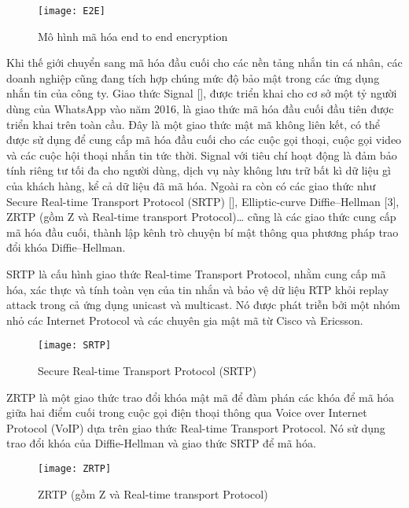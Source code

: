 \documentclass[../main-report.tex]{subfiles}
\begin{document}
\begin{figure}[ht!]
\begin{center}
\label{fig:E2E}
\texttt{[image: E2E]}
\caption{Mô hình mã hóa end to end encryption}
\end{center}
\end{figure}

Khi thế giới chuyển sang mã hóa đầu cuối cho các nền tảng nhắn tin cá nhân, các doanh nghiệp cũng đang tích hợp chúng mức độ bảo mật trong các ứng dụng nhắn tin của công ty. Giao thức Signal [\cite{1}], được triển khai cho cơ sở một tỷ người dùng của WhatsApp vào năm 2016, là giao thức mã hóa đầu cuối đầu tiên được triển khai trên toàn cầu. Đây là một giao thức mật mã không liên kết, có thể được sử dụng để cung cấp mã hóa đầu cuối cho các cuộc gọi thoại, cuộc gọi video và các cuộc hội thoại nhắn tin tức thời. Signal với tiêu chí hoạt động là đảm bảo tính riêng tư tối đa cho người dùng, dịch vụ này không lưu trữ bất kì dữ liệu gì của khách hàng, kể cả dữ liệu đã mã hóa. Ngoài ra còn có các giao thức như Secure Real-time Transport Protocol (SRTP) [\cite{2}], Elliptic-curve Diffie–Hellman [3], ZRTP (gồm Z và Real-time transport Protocol)… cũng là các giao thức cung cấp mã hóa đầu cuối, thành lập kênh trò chuyện bí mật thông qua phương pháp trao đổi khóa Diffie–Hellman.

SRTP là cấu hình giao thức Real-time Transport Protocol, nhằm cung cấp mã hóa, xác thực và tính toàn vẹn của tin nhắn và bảo vệ dữ liệu RTP khỏi replay attack trong cả ứng dụng unicast và multicast. Nó được phát triễn bởi một nhóm nhỏ các Internet Protocol và các chuyên gia mật mã từ Cisco và Ericsson.


\begin{figure}[ht!]
\begin{center}
\label{fig:SRTP}
\texttt{[image: SRTP]}
\caption{Secure Real-time Transport Protocol (SRTP)}
\end{center}
\end{figure}

ZRTP là một giao thức trao đổi khóa mật mã để đàm phán các khóa để mã hóa giữa hai điểm cuối trong cuộc gọi điện thoại thông qua Voice over Internet Protocol (VoIP) dựa trên giao thức Real-time Transport Protocol. Nó sử dụng trao đổi khóa của Diffie-Hellman và giao thức SRTP để mã hóa.

\begin{figure}[ht!]
\begin{center}
\label{fig:ZRTP}
\texttt{[image: ZRTP]}
\caption{ZRTP (gồm Z và Real-time transport Protocol)}
\end{center}
\end{figure}
\end{document}
